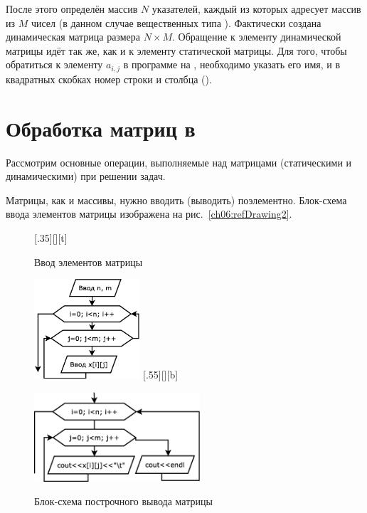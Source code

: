 После этого определён массив $N$ указателей, каждый из которых адресует массив из $M$ чисел (в данном
случае вещественных типа ). Фактически создана динамическая матрица размера $N\times M$.
Обращение к элементу
динамической матрицы идёт так же, как и к элементу статической матрицы. Для того, чтобы обратиться к элементу 
$a_{i,j}$ в программе на , необходимо указать его имя, и в квадратных скобках номер строки 
и столбца ().

\section[Обработка матриц в \Sys{С(С++)}]{Обработка матриц в }
Рассмотрим основные операции, выполняемые над матрицами (статическими и динамическими) при решении задач.

Матрицы, как и массивы, нужно вводить (выводить) поэлементно. Блок-схема ввода элементов матрицы  изображена на
рис.~\ref{ch06:refDrawing2}.

\begin{figure}[H]
\begin{floatrow}
[.35\textwidth][\FBheight][t]
{\caption{Ввод элементов матрицы}
\label{ch06:refDrawing2}}
{\includegraphics[width=0.35\textwidth,keepaspectratio]{img/ris_6_3}}\hspace*{0.05\textwidth}
%
[.55\textwidth][\FBheight][b]
{\caption{Блок-схема построчного вывода матрицы}
\label{ch06:refDrawing3}}
{\includegraphics[width=0.55\textwidth,keepaspectratio]{img/ris_6_4}}
\end{floatrow}
\end{figure}


